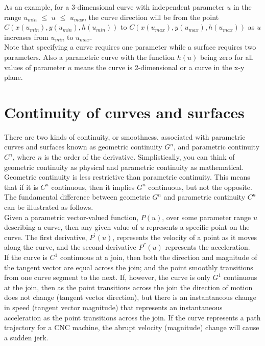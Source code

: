 As an example, for a 3-dimensional curve with independent parameter $u$ in the range $u_{min}$ $\le$  $u$ $\le$ $u_{max}$, the curve direction will be from the point $C(x(u_{min}), y(u_{min}), h(u_{min}))$ to $C(x(u_{max}), y(u_{max}), h(u_{max}))$ as $u$ increases from $u_{min}$ to $u_{max}$.\\

Note that specifying a curve requires one parameter while a surface requires two parameters. Also a parametric curve with the function $h(u)$ being zero for all values of parameter $u$ means the curve is 2-dimensional or a curve in the x-y plane.


\section{Continuity of curves and surfaces}

There are two kinds of continuity, or smoothness, associated with parametric curves and surfaces known as geometric continuity $G^{n}$, and parametric continuity $C^{n}$, where $n$ is the order of the derivative. Simplistically, you can think of geometric continuity as physical and parametric continuity as mathematical. Geometric continuity is less restrictive than parametric continuity. This means that if it is $C^{n}$ continuous, then it implies $G^{n}$ continuous, but not the opposite. The fundamental difference between geometric $G^{n}$ and parametric continuity $C^{n}$ can be illustrated as follows. \\

Given a parametric vector-valued function, $P(u)$, over some parameter range $u$ describing a curve, then any given value of $u$ represents a specific point on the curve. The first derivative, $P^{'}(u)$, represents the velocity of a point as it moves along the curve, and the second derivative $P^{''}(u)$ represents the acceleration. \\

If the curve is $C^{1}$ continuous at a join, then both the direction and magnitude of the tangent vector are equal across the join; and the point smoothly transitions from one curve segment to the next. If, however, the curve is only $G^{1}$ continuous at the join, then as the point transitions across the join the direction of motion does not change (tangent vector direction), but there is an instantaneous change in speed (tangent vector magnitude) that represents an instantaneous acceleration as the point transitions across the join. If the curve represents a path trajectory for a CNC machine, the abrupt velocity (magnitude) change will cause a sudden jerk.\\

